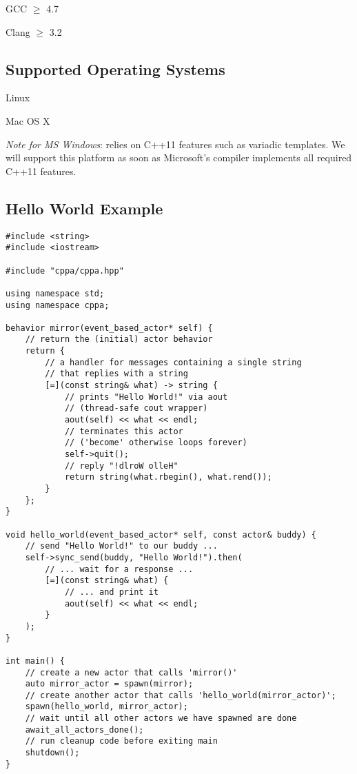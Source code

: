 \begin{itemize*}
  \item GCC $\ge$ 4.7
  \item Clang $\ge$ 3.2
\end{itemize*}

\subsection{Supported Operating Systems}

\begin{itemize*}
\item Linux
\item Mac OS X
\item \textit{Note for MS Windows}:
\libcppa relies on C++11 features such as variadic templates.
We will support this platform as soon as Microsoft's compiler implements all required C++11 features.
\end{itemize*}

\clearpage
\subsection{Hello World Example}

\begin{lstlisting}
#include <string>
#include <iostream>

#include "cppa/cppa.hpp"

using namespace std;
using namespace cppa;

behavior mirror(event_based_actor* self) {
    // return the (initial) actor behavior
    return {
        // a handler for messages containing a single string
        // that replies with a string
        [=](const string& what) -> string {
            // prints "Hello World!" via aout
            // (thread-safe cout wrapper)
            aout(self) << what << endl;
            // terminates this actor
            // ('become' otherwise loops forever)
            self->quit();
            // reply "!dlroW olleH"
            return string(what.rbegin(), what.rend());
        }
    };
}

void hello_world(event_based_actor* self, const actor& buddy) {
    // send "Hello World!" to our buddy ...
    self->sync_send(buddy, "Hello World!").then(
        // ... wait for a response ...
        [=](const string& what) {
            // ... and print it
            aout(self) << what << endl;
        }
    );
}

int main() {
    // create a new actor that calls 'mirror()'
    auto mirror_actor = spawn(mirror);
    // create another actor that calls 'hello_world(mirror_actor)';
    spawn(hello_world, mirror_actor);
    // wait until all other actors we have spawned are done
    await_all_actors_done();
    // run cleanup code before exiting main
    shutdown();
}
\end{lstlisting}
